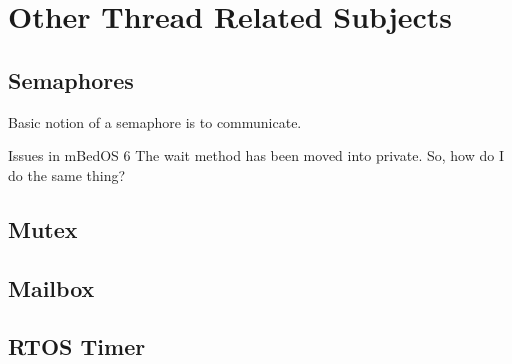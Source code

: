 \documentclass{article}
\begin{document}


\section{Other Thread Related Subjects} %
\label{sec:other_thread_related_subjects}

\subsection{Semaphores} %
\label{sub:semaphores}

Basic notion of a semaphore is to communicate.

Issues in mBedOS 6
The wait method has been moved into private.  So, how do I do the same thing?


\subsection{Mutex} %
\label{sub:mutex}


\subsection{Mailbox} %
\label{sub:mailbox}


\subsection{RTOS Timer} %
\label{sub:rtos_timer}


\end{document}
